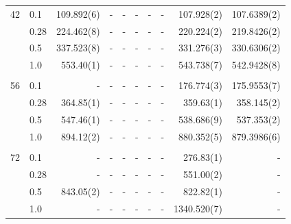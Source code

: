 \begin{landscape}
\begin{table} [H]
\begin{tabularx}{\hsize}{l:l|RRRRRRRR}
		42 & 0.1 & 109.892(6) & - & - & - & - & - &  107.928(2) & 107.6389(2) \\ 
		& 0.28 & 224.462(8) & - & - & - & - & - & 220.224(2) & 219.8426(2) \\
		& 0.5 & 337.523(8) & - & - & - & - & - & 331.276(3) & 330.6306(2) \\
		& 1.0 & 553.40(1) & - & - & - & - & - & 543.738(7) & 542.9428(8) \\ \hdashline \\
		
		56 & 0.1 & - & - & - & - & - & - & 176.774(3) & 175.9553(7) \\ 
		& 0.28 & 364.85(1) & - & - & - & - & - & 359.63(1) & 358.145(2) \\
		& 0.5 & 547.46(1) & - & - & - & - & - & 538.686(9) & 537.353(2) \\
		& 1.0 & 894.12(2) & - & - & - & - & - & 880.352(5) & 879.3986(6) \\ \hdashline \\
		
		72 & 0.1 & - & - & - & - & - & - & 276.83(1) & - \\ 
		& 0.28 & - & - & - & - & - & - & 551.00(2) & - \\
		& 0.5 & 843.05(2) & - & - & - & - & - & 822.82(1) & - \\
		& 1.0 & - & - & - & - & - & - & 1340.520(7) & - \\ \hline\hline
	\end{tabularx}
\end{table}


\end{landscape}
